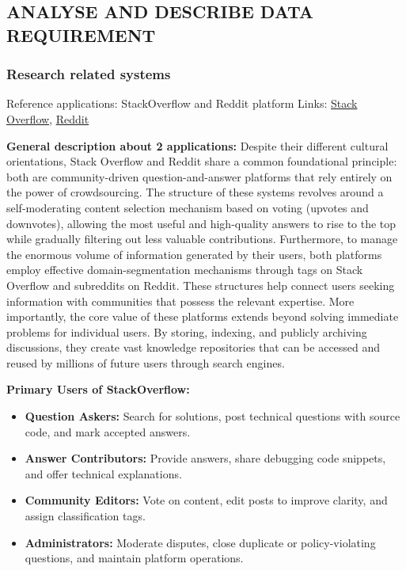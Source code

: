 \subsection{ANALYSE AND DESCRIBE DATA REQUIREMENT}
\subsubsection{Research related systems}
Reference applications: StackOverflow and Reddit platform
\newline 
\indent Links: \href{https://stackoverflow.com/}{Stack Overflow},
\href{https://www.reddit.com/}{Reddit}

\textbf{General description about 2 applications:} Despite their different cultural orientations, Stack Overflow and Reddit share a common foundational principle: both are community-driven question-and-answer platforms that rely entirely on the power of crowdsourcing. The structure of these systems revolves around a self-moderating content selection mechanism based on voting (upvotes and downvotes), allowing the most useful and high-quality answers to rise to the top while gradually filtering out less valuable contributions. Furthermore, to manage the enormous volume of information generated by their users, both platforms employ effective domain-segmentation mechanisms through tags on Stack Overflow and subreddits on Reddit. These structures help connect users seeking information with communities that possess the relevant expertise. More importantly, the core value of these platforms extends beyond solving immediate problems for individual users. By storing, indexing, and publicly archiving discussions, they create vast knowledge repositories that can be accessed and reused by millions of future users through search engines.

\noindent \textbf{Primary Users of StackOverflow:}
\begin{itemize}
    \item \textbf{Question Askers:} Search for solutions, post technical questions with source code, and mark accepted answers.
    \item \textbf{Answer Contributors:} Provide answers, share debugging code snippets, and offer technical explanations.
    \item \textbf{Community Editors:} Vote on content, edit posts to improve clarity, and assign classification tags.
    \item \textbf{Administrators:} Moderate disputes, close duplicate or policy-violating questions, and maintain platform operations.
\end{itemize}

